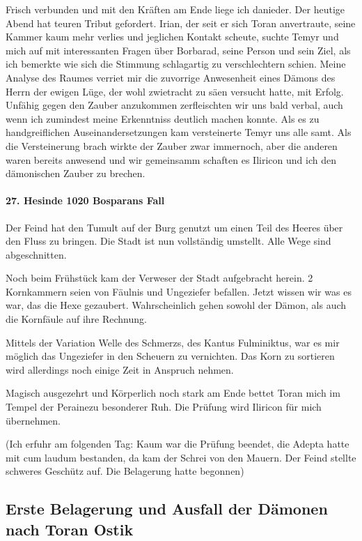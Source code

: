 Frisch verbunden und mit den Kräften am Ende liege ich danieder. Der heutige Abend hat teuren Tribut gefordert. Irian, der seit er sich Toran anvertraute, seine Kammer kaum mehr verlies und jeglichen Kontakt scheute, suchte Temyr und mich auf mit interessanten Fragen über Borbarad, seine Person und sein Ziel, als ich bemerkte wie sich die Stimmung schlagartig zu verschlechtern schien. Meine Analyse des Raumes verriet mir die zuvorrige Anwesenheit eines Dämons des Herrn der ewigen Lüge, der wohl zwietracht zu säen versucht hatte, mit Erfolg. Unfähig gegen den Zauber anzukommen zerfleischten wir uns bald verbal, auch wenn ich zumindest meine Erkenntniss deutlich machen konnte. Als es zu handgreiflichen Auseinandersetzungen kam versteinerte Temyr uns alle samt. Als die Versteinerung brach wirkte der Zauber zwar immernoch, aber die anderen waren bereits anwesend und wir gemeinsamm schaften es Iliricon und ich den dämonischen Zauber zu brechen.

\paragraph{27. Hesinde 1020 Bosparans Fall}
Der Feind hat den Tumult auf der Burg genutzt um einen Teil des Heeres über den Fluss zu bringen. Die Stadt ist nun vollständig umstellt. Alle Wege sind abgeschnitten.

Noch beim Frühstück kam der Verweser der Stadt aufgebracht herein. 2 Kornkammern seien von Fäulnis und Ungeziefer befallen. Jetzt wissen wir was es war, das die Hexe gezaubert. Wahrscheinlich gehen sowohl der Dämon, als auch die Kornfäule auf ihre Rechnung.

Mittels der Variation Welle des Schmerzs, des Kantus Fulminiktus, war es mir möglich das Ungeziefer in den Scheuern zu vernichten. Das Korn zu sortieren wird allerdings noch einige Zeit in Anspruch nehmen.

Magisch ausgezehrt und Körperlich noch stark am Ende bettet Toran mich im Tempel der Perainezu besonderer Ruh. Die Prüfung wird Iliricon für mich übernehmen.

(Ich erfuhr am folgenden Tag: Kaum war die Prüfung beendet, die Adepta hatte mit cum laudum bestanden, da kam der Schrei von den Mauern. Der Feind stellte schweres Geschütz auf. Die Belagerung hatte begonnen)

\subsection{Erste Belagerung und Ausfall der Dämonen nach Toran Ostik}

